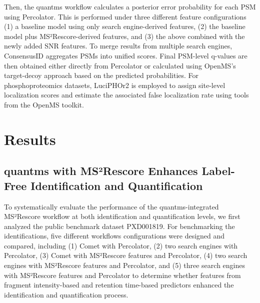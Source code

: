 \documentclass[12pt]{article}
\begin{document}
Then, the quantms workflow calculates a posterior error probability for each PSM using Percolator. This is performed under three different feature configurations (1) a baseline model using only search engine-derived features, (2) the baseline model plus MS²Rescore-derived features, and (3) the above combined with the newly added SNR features. To merge results from multiple search engines, ConsensusID aggregates PSMs into unified scores. %
Final PSM-level q-values are then obtained either directly from Percolator or calculated using OpenMS's target-decoy approach based on the predicted probabilities. For phosphoproteomics datasets, LuciPHOr2 is employed to assign site-level localization scores and estimate the associated false localization rate using tools from the OpenMS toolkit. %


\section{Results}

\subsection{quantms with MS²Rescore Enhances Label-Free Identification and Quantification}
To systematically evaluate the performance of the quantms-integrated MS²Rescore workflow at both identification and quantification levels, we first analyzed the public benchmark dataset PXD001819. %
For benchmarking the identifications, five different workflows configurations were designed and compared, including (1) Comet with Percolator, (2) two search engines with Percolator, (3) Comet with MS²Rescore features and Percolator, (4) two search engines with MS²Rescore features and Percolator, and (5) three search engines with MS²Rescore features and Percolator to determine whether features from fragment intensity-based and retention time-based predictors enhanced the identification and quantification process. %
\end{document}
